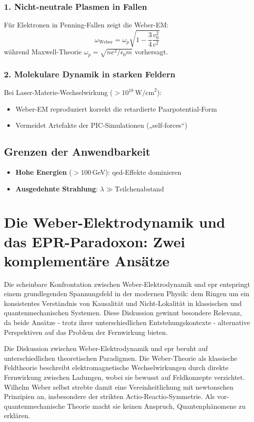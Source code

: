 \subsubsection{1. Nicht-neutrale Plasmen in Fallen}
Für Elektronen in Penning-Fallen zeigt die Weber-EM:
\begin{equation}
\omega_{\text{Weber}} = \omega_p\sqrt{1 - \frac{3}{4}\frac{v_0^2}{c^2}}
\end{equation}
während Maxwell-Theorie $\omega_p = \sqrt{ne^2/\epsilon_0 m}$ vorhersagt.

\subsubsection{2. Molekulare Dynamik in starken Feldern}
Bei Laser-Materie-Wechselwirkung ($>10^{18}\,\text{W/cm}^2$):
\begin{itemize}
\item Weber-EM reproduziert korrekt die retardierte Paarpotential-Form
\item Vermeidet Artefakte der PIC-Simulationen („self-forces“)
\end{itemize}

\subsection{Grenzen der Anwendbarkeit}
\begin{itemize}
\item \textbf{Hohe Energien} ($>100$\,GeV): \gls{qed}-Effekte dominieren
\item \textbf{Ausgedehnte Strahlung}:  $\lambda \gg \text{Teilchenabstand}$
\end{itemize}

\section{Die Weber-Elektrodynamik und das EPR-Paradoxon: Zwei komplementäre Ansätze}
Die scheinbare Konfrontation zwischen Weber-Elektrodynamik und \gls{epr} entspringt einem grundlegenden Spannungsfeld in der modernen Physik: dem Ringen um ein konsistentes
Verständnis von Kausalität und Nicht-Lokalität in klassischen und quantenmechanischen Systemen. Diese Diskussion gewinnt besondere Relevanz, da beide Ansätze - trotz ihrer
unterschiedlichen Entstehungskontexte - alternative Perspektiven auf das Problem der Fernwirkung bieten.

Die Diskussion zwischen Weber-Elektrodynamik und \gls{epr} beruht auf unterschiedlichen theoretischen Paradigmen. Die Weber-Theorie als klassische Feldtheorie beschreibt
elektromagnetische Wechselwirkungen durch direkte Fernwirkung zwischen Ladungen, wobei sie bewusst auf Feldkonzepte verzichtet. Wilhelm Weber selbst strebte damit eine Vereinheitlichung
mit newtonschen Prinzipien an, insbesondere der strikten Actio-Reactio-Symmetrie. Als vor-quantenmechanische Theorie macht sie keinen Anspruch, Quantenphänomene zu erklären.

